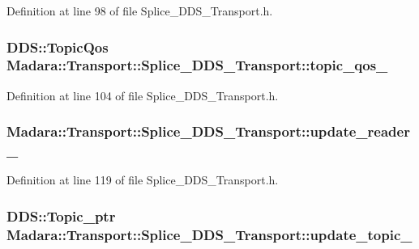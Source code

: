 Definition at line 98 of file Splice\_\-DDS\_\-Transport.h.

\hypertarget{classMadara_1_1Transport_1_1Splice__DDS__Transport_a143c960e01bc4c0cef1cde27af324082}{
\subsubsection[{topic\_\-qos\_\-}]{\setlength{\rightskip}{0pt plus 5cm}DDS::TopicQos {\bf Madara::Transport::Splice\_\-DDS\_\-Transport::topic\_\-qos\_\-}}}
\label{d0/d91/classMadara_1_1Transport_1_1Splice__DDS__Transport_a143c960e01bc4c0cef1cde27af324082}


Definition at line 104 of file Splice\_\-DDS\_\-Transport.h.

\hypertarget{classMadara_1_1Transport_1_1Splice__DDS__Transport_a810564431d62459ba91ffff421870b16}{
\subsubsection[{update\_\-reader\_\-}]{ {\bf Madara::Transport::Splice\_\-DDS\_\-Transport::update\_\-reader\_\-}}}
\label{d0/d91/classMadara_1_1Transport_1_1Splice__DDS__Transport_a810564431d62459ba91ffff421870b16}


Definition at line 119 of file Splice\_\-DDS\_\-Transport.h.

\hypertarget{classMadara_1_1Transport_1_1Splice__DDS__Transport_aac03f3106cb4258452465cf6d4ddf2e3}{
\subsubsection[{update\_\-topic\_\-}]{\setlength{\rightskip}{0pt plus 5cm}DDS::Topic\_\-ptr {\bf Madara::Transport::Splice\_\-DDS\_\-Transport::update\_\-topic\_\-}}}
\label{d0/d91/classMadara_1_1Transport_1_1Splice__DDS__Transport_aac03f3106cb4258452465cf6d4ddf2e3}


